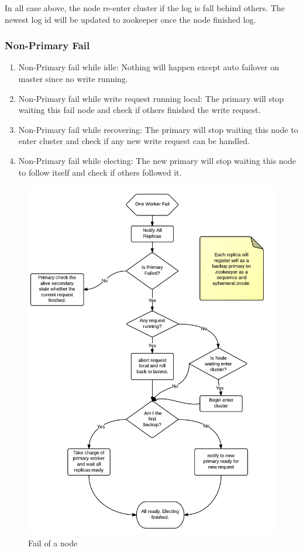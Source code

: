 In all case above, the node re-enter cluster if the log is fall behind others. The newest log id will be updated to zookeeper once the node finished log.

\subsubsection{Non-Primary Fail}
\begin{enumerate}

\item Non-Primary fail while idle: Nothing will happen except auto failover on master since no write running.
\item Non-Primary fail while write request running local: The primary will stop waiting this fail node and check if others finished the write request.
\item Non-Primary fail while recovering: The primary will stop waiting this node to enter cluster and check if any new write request can be handled.
\item Non-Primary fail while electing: The new primary will stop waiting this node to follow itself and check if others followed it.

\end{enumerate}

\begin{figure}[!ht]\centering
  \includegraphics[width=.60\textwidth]{Figures/NodeFail.png}
  \caption{Fail of a node}\label{fig:nodefail}
\end{figure}

